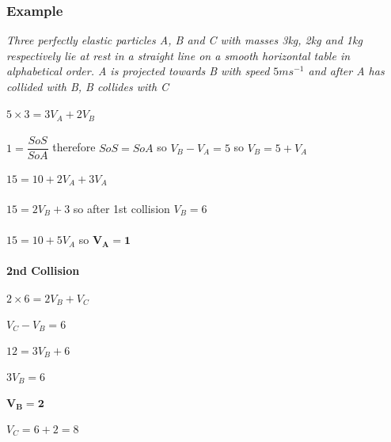 \documentclass{article}[18pt]
\begin{document}
\subsubsection{Example}
\textit{Three perfectly elastic particles A, B and C with masses 3kg, 2kg and 1kg respectively lie at rest in a straight line on a smooth horizontal table in alphabetical order. A is projected towards B with speed $5ms^{-1}$ and after A has collided with B, B collides with C}\\
\\
$5\times3=3V_A+2V_B$\\
\\
$1=\dfrac{SoS}{SoA}$ therefore $SoS=SoA$ so $V_B-V_A=5$ so $V_B=5+V_A$\\
\\
$15=10+2V_A+3V_A$\\
\\
$15=2V_B+3$ so after 1st collision $V_B=6$\\
\\
$15=10+5V_A$ so $\mathbf{V_A=1}$\\
\\
\textbf{2nd Collision}\\
\\
$2\times6=2V_B+V_C$\\
\\
$V_C-V_B=6$\\
\\
$12=3V_B+6$\\
\\
$3V_B=6$\\
\\
$\mathbf{V_B=2}$\\
\\
$V_C=6+2=8$
\end{document}
